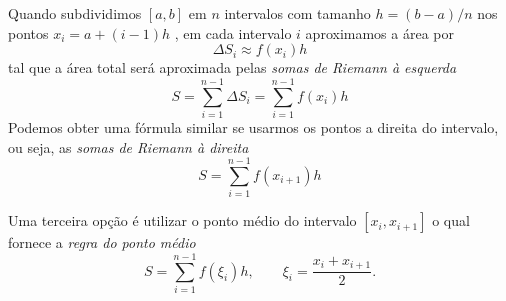 Quando subdividimos $[a,b]$ em $n$ intervalos com tamanho $h=(b-a)/n$ nos pontos $x_i=a+(i-1)h$ , em cada intervalo $i$ aproximamos a área por
\begin{equation*}
  \Delta S_i \approx f(x_i)h
\end{equation*}
tal que a área total será aproximada pelas \emph{somas de Riemann à esquerda}
\begin{equation}
S =\sum_{i=1}^{n-1} \Delta S_i = \sum_{i=1}^{n-1} f(x_i) h
\end{equation}
Podemos obter uma fórmula similar se usarmos os pontos a direita do intervalo, ou seja, as \emph{somas de Riemann à direita}
\begin{equation}
S = \sum_{i=1}^{n-1} f(x_{i+1}) h
\end{equation}

Uma terceira opção é utilizar o ponto médio do intervalo $[x_i,x_{i+1}]$ o qual fornece a \emph{regra do ponto médio}
\begin{equation}\label{ponto_medio_1}
S = \sum_{i=1}^{n-1} f(\xi_i ) h, \qquad \xi_i=\frac{x_i+x_{i+1}}{2}.
\end{equation}







